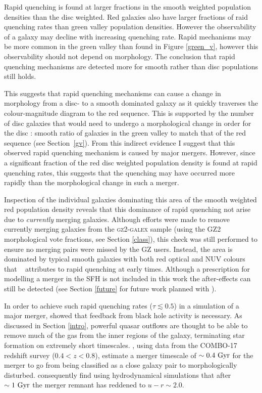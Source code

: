 Rapid quenching is found at larger fractions in the smooth weighted population densities than the disc weighted. Red galaxies also have larger fractions of raid quenching rates than green valley population densities. However the observability of a galaxy may decline with increasing quenching rate. Rapid mechanisms may be more common in the green valley than found in Figure \ref{green_v}, however this observability should not depend on morphology. The conclusion that rapid quenching mechanisms are detected more for smooth rather than disc populations still holds. 

This suggests that rapid quenching mechanisms can cause a change in morphology from a disc- to a smooth dominated galaxy as it quickly traverses the colour-magnitude diagram to the red sequence. This is supported by the number of disc galaxies that would need to undergo a morphological change in order for the disc : smooth ratio of galaxies in the green valley to match that of the red sequence (see Section~\ref{gv}). From this indirect evidence I suggest that this observed rapid quenching mechanism is caused by major mergers. However, since a significant fraction of the red disc weighted population density is found at rapid quenching rates, this suggests that the quenching may have occurred more rapidly than the morphological change in such a merger.

Inspection of the individual galaxies dominating this area of the smooth weighted red population density reveals that this dominance of rapid quenching not arise due to \emph{currently} merging galaxies. Although efforts were made to remove currently merging galaxies from the \textsc{gz2-galex} sample (using the GZ2 morphological vote fractions, see Section \ref{class}), this check was still performed to ensure no merging pairs were missed by the GZ users. Instead, the area is dominated by typical smooth galaxies with both red optical and NUV colours that \starpy~ attributes to rapid quenching at early times. Although a prescription for modelling a merger in the SFH is not included in this work the after-effects can still be detected (see Section \ref{future} for future work planned with \starpy).

In order to achieve such rapid quenching rates ($\tau \lesssim 0.5$) in a simulation of a major merger, \citet*{springel05} showed that feedback from black hole activity is necessary. As discussed in Section \ref{intro}, powerful quasar outflows are thought to be able to remove much of the gas from the inner regions of the galaxy, terminating star formation on extremely short timescales. \citet{Bell06}, using data from the COMBO-17 redshift survey ($0.4 < z < 0.8$), estimate a merger timescale of $\sim 0.4~\rm{Gyr}$ for the merger to go from being classified as a close galaxy pair to morphologically disturbed. \citet*{springel05b} consequently find using hydrodynamical simulations that after $\sim1~\rm{Gyr}$ the merger remnant has reddened to $u-r \sim 2.0$. 

